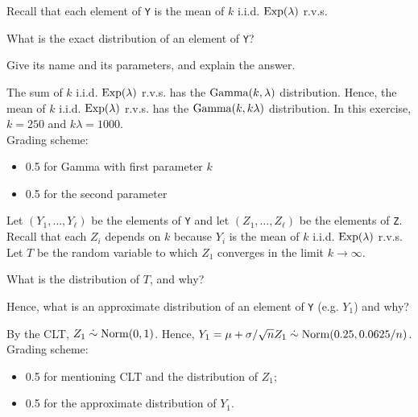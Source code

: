 \vspace*{20pt}


Recall that each element of  \texttt{Y} is the mean of $k$ i.i.d. $\mathrm{Exp}(\lambda)$ r.v.s.

\begin{exercise}[1]
What is the exact distribution of an element of \texttt{Y}? 

Give its name and its parameters, and explain the answer.
\begin{solution}
The sum of $k$ i.i.d.  $\mathrm{Exp}(\lambda)$ r.v.s. has the $\mathrm{Gamma}(k, \lambda)$ distribution.
Hence, the mean of $k$ i.i.d.  $\mathrm{Exp}(\lambda)$ r.v.s. has the $\mathrm{Gamma}(k, k\lambda)$ distribution.
In this exercise, $k=250$ and $k\lambda = 1000$. \\ 
Grading scheme:
\begin{itemize}
\item 0.5 for Gamma with first parameter $k$
\item 0.5 for the second parameter
\end{itemize}
\end{solution}
\end{exercise}


\vspace*{30pt}



Let $(Y_1, \ldots, Y_{\ell})$ be the elements of \texttt{Y} and let $(Z_1, \ldots, Z_{\ell})$ be the elements of  \texttt{Z}. Recall that each $Z_i$ depends on $k$ because $Y_i$ is the mean of $k$ i.i.d. $\mathrm{Exp}(\lambda)$ r.v.s. Let $T$ be the random variable to which $Z_1$ converges in the limit  $k \to \infty$.

\begin{exercise}[1]
What is the distribution of $T$, and why? 

Hence, what is an approximate distribution of an element of \texttt{Y} (e.g. $Y_1$) and why?
\begin{solution}
By the CLT, $Z_1 \;\dot{\sim}\; \mathrm{Norm}(0,1)$. Hence,  $Y_1 = \mu + \sigma/\sqrt{n}Z_1 \;\dot{\sim}\; \mathrm{Norm}(0.25,0.0625/n)$. \\ 
Grading scheme:
\begin{itemize}
\item 0.5 for mentioning CLT and the distribution of $Z_1$;
\item 0.5 for the approximate distribution of $Y_1$.
\end{itemize}
\end{solution}
\end{exercise}


